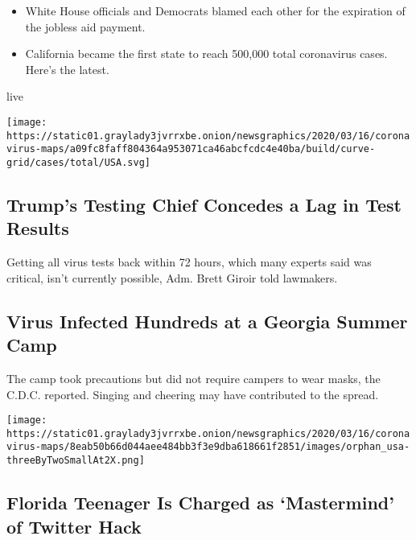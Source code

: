 \begin{itemize}
\tightlist
\item
  White House officials and Democrats blamed each other for the
  expiration of the jobless aid payment.
\item
  California became the first state to reach 500,000 total coronavirus
  cases. Here's the latest.
\end{itemize}

live

\texttt{[image: https://static01.graylady3jvrrxbe.onion/newsgraphics/2020/03/16/coronavirus-maps/a09fc8faff804364a953071ca46abcfcdc4e40ba/build/curve-grid/cases/total/USA.svg]}

\href{/2020/07/31/us/politics/trump-coronavirus-testing.html}{}

\hypertarget{trumps-testing-chief-concedes-a-lag-in-test-results}{%
\subsection{Trump's Testing Chief Concedes a Lag in Test
Results}\label{trumps-testing-chief-concedes-a-lag-in-test-results}}

Getting all virus tests back within 72 hours, which many experts said
was critical, isn't currently possible, Adm. Brett Giroir told
lawmakers.

\href{/2020/07/31/health/coronavirus-children-camp.html}{}

\hypertarget{virus-infected-hundreds-at-a-georgia-summer-camp}{%
\subsection{Virus Infected Hundreds at a Georgia Summer
Camp}\label{virus-infected-hundreds-at-a-georgia-summer-camp}}

The camp took precautions but did not require campers to wear masks, the
C.D.C. reported. Singing and cheering may have contributed to the
spread.

\texttt{[image: https://static01.graylady3jvrrxbe.onion/newsgraphics/2020/03/16/coronavirus-maps/8eab50b66d044aee484bb3f3e9dba618661f2851/images/orphan\_usa-threeByTwoSmallAt2X.png]}

\href{/2020/07/31/technology/twitter-hack-arrest.html}{}

\hypertarget{florida-teenager-is-charged-as-mastermind-of-twitter-hack}{%
\subsection{Florida Teenager Is Charged as `Mastermind' of Twitter
Hack}\label{florida-teenager-is-charged-as-mastermind-of-twitter-hack}}

